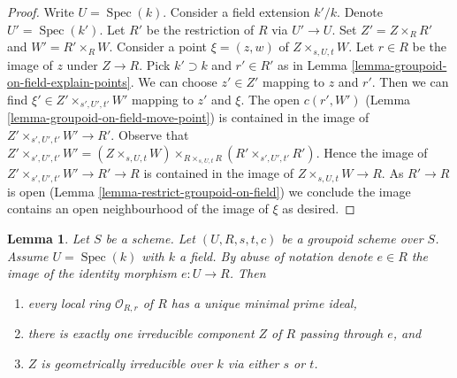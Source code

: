\documentclass{stacks-project}
\theoremstyle{plain}
\newtheorem{lemma}[subsection]{Lemma}
\theoremstyle{definition}
\theoremstyle{remark}
\numberwithin{equation}{subsection}
\def\Spec{\mathop{\mathrm{Spec}}}
\begin{document}
\begin{proof}
Write $U = \Spec(k)$. Consider a field extension $k'/k$. Denote
$U' = \Spec(k')$. Let $R'$ be the restriction of $R$ via $U' \to U$.
Set $Z' = Z \times_R R'$ and $W' = R' \times_R W$.
Consider a point $\xi = (z, w)$ of $Z \times_{s, U, t} W$.
Let $r \in R$ be the image of $z$ under $Z \to R$.
Pick $k' \supset k$ and $r' \in R'$ as in
Lemma \ref{lemma-groupoid-on-field-explain-points}.
We can choose $z' \in Z'$ mapping to $z$ and $r'$.
Then we can find $\xi' \in Z' \times_{s', U', t'} W'$
mapping to $z'$ and $\xi$. The open $c(r', W')$
(Lemma \ref{lemma-groupoid-on-field-move-point}) is
contained in the image of $Z' \times_{s', U', t'} W' \to R'$.
Observe that $Z' \times_{s', U', t'} W' = (Z \times_{s, U, t} W)
\times_{R \times_{s, U, t} R} (R' \times_{s', U', t'} R')$.
Hence the image of $Z' \times_{s', U', t'} W' \to R' \to R$
is contained in the image of $Z \times_{s, U, t} W \to R$.
As $R' \to R$ is open (Lemma \ref{lemma-restrict-groupoid-on-field})
we conclude the image contains an open neighbourhood of
the image of $\xi$ as desired.
\end{proof}

\begin{lemma}
\label{lemma-groupoid-on-field-geometrically-irreducible}
Let $S$ be a scheme. Let $(U, R, s, t, c)$ be a groupoid scheme
over $S$. Assume $U = \Spec(k)$ with $k$ a field.
By abuse of notation denote $e \in R$ the image of the identity
morphism $e : U \to R$. Then
\begin{enumerate}
\item every local ring $\mathcal{O}_{R, r}$ of $R$ has a unique
minimal prime ideal,
\item there is exactly one irreducible component $Z$ of $R$
passing through $e$, and
\item $Z$ is geometrically irreducible over $k$ via either
$s$ or $t$.
\end{enumerate}
\end{lemma}
\end{document}
